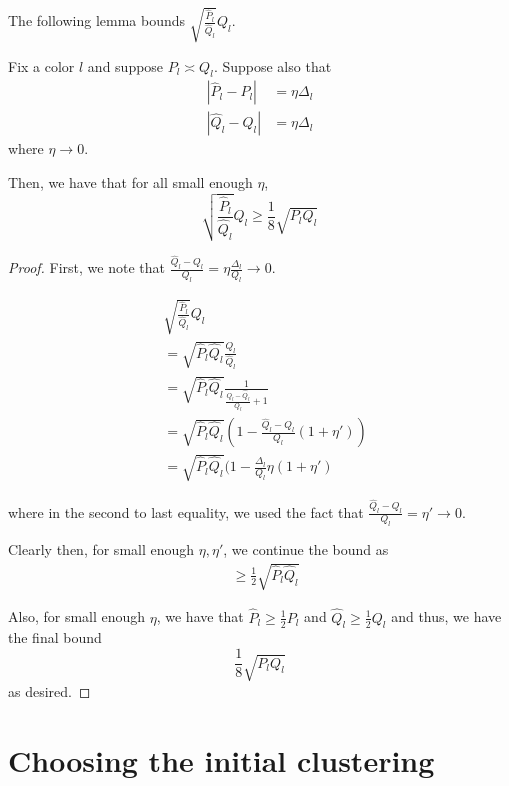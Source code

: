 \documentclass{article}
\begin{document}
The following lemma bounds $\sqrt{ \frac{\hat{P}_l}{\hat{Q}_l} } Q_l$. 
\begin{lemma}
\label{lem:sqrt_ratio_times_ql}

Fix a color $l$ and suppose $P_l \asymp Q_l$. Suppose also that
\begin{align*}
|\hat{P}_l - P_l| &= \eta \Delta_l \\
|\hat{Q}_l - Q_l| &= \eta \Delta_l
\end{align*}
where $\eta \rightarrow 0$. 

Then, we have that for all small enough $\eta$, 
\[
\sqrt{ \frac{\hat{P}_l}{\hat{Q}_l} } Q_l \geq 
  \frac{1}{8} \sqrt{P_l Q_l}
\]
\end{lemma}

\begin{proof}

First, we note that $\frac{ \hat{Q}_l - Q_l}{Q_l} = \eta \frac{\Delta_l}{Q_l} \rightarrow 0$. 

\begin{align*}
& \sqrt{\frac{\hat{P}_l}{\hat{Q}_l} } Q_l \\
&= \sqrt{ \hat{P}_l \hat{Q}_l} \frac{Q_l}{\hat{Q}_l} \\
&= \sqrt{\hat{P}_l \hat{Q}_l} \frac{1}{ \frac{Q_l - \hat{Q}_l}{Q_l} + 1 } \\
&= \sqrt{\hat{P}_l \hat{Q}_l} 
  \left( 1 - \frac{\hat{Q}_l - Q_l}{Q_l} (1 + \eta') \right)  \\
&= \sqrt{\hat{P}_l \hat{Q}_l} (1 - \frac{\Delta_l}{Q_l} \eta (1 + \eta') 
\end{align*}

where in the second to last equality, we used the fact that $\frac{\hat{Q}_l - Q_l}{Q_l} = \eta' \rightarrow 0$. 

Clearly then, for small enough $\eta, \eta'$, we continue the bound as 
\begin{align*}
&\geq \frac{1}{2} \sqrt{ \hat{P}_l \hat{Q}_l} 
\end{align*}

Also, for small enough $\eta$, we have that $\hat{P}_l \geq \frac{1}{2} P_l$ and $\hat{Q}_l \geq \frac{1}{2} Q_l$ and thus, we have the final bound
\[
\frac{1}{8} \sqrt{ P_l Q_l}
\]
as desired. 

\end{proof}



\newpage
\section{Choosing the initial clustering}
\label{sec:initial_clustering}
\end{document}

